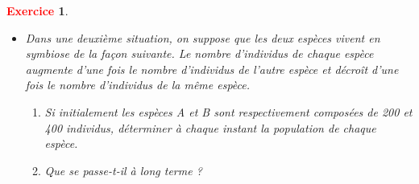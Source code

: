 \documentclass[11pt]{article}
\theoremstyle{mythmstyle}
\newtheorem{exo}{\textcolor{red}{\textbf{Exercice}}}
\begin{document}
\begin{exo}
\begin{itemize}
\begin{enumerate}
\begin{solution}
Les valeurs propres de $M$ sont $4$ et $2$. Donc, il existe une matrice inversible $P$ tel que

$$
M^k= P^{-1}\begin{pmatrix}4^k&0\\ 0& 2^k\end{pmatrix}.P
$$
    
\end{solution}     
     
     \item  Est-ce qu’une des espèces est en voie d'extinction? Si oui, au bout de combien de temps.
     
     
     
\begin{solution}

$$
\begin{pmatrix} A_{0}\\B_{0}\end{pmatrix}=
\begin{pmatrix} 100\\200\end{pmatrix},
\begin{pmatrix} A_{1}\\B_{1}\end{pmatrix}=
\begin{pmatrix} 100\\500\end{pmatrix},
\begin{pmatrix} A_{2}\\B_{2}\end{pmatrix}=
\begin{pmatrix} -200\\1400\end{pmatrix}
$$


Donc l'espèce $A$ est en voie d'extinction.
\end{solution}    


\end{enumerate}


 \item  Dans une deuxième situation, on suppose que les deux espèces vivent en symbiose de la façon suivante. Le nombre d’individus de chaque espèce augmente d’une fois le nombre d’individus de l’autre espèce et décroît d’une fois le nombre d’individus de la même espèce.
\begin{enumerate}
    \item Si initialement les espèces A et B sont respectivement composées de 200 et 400 individus, déterminer à chaque instant la population de chaque espèce.
    \item  Que se passe-t-il à long terme ?
\end{enumerate}
\end{itemize}
 \end{exo}
 
\end{document}
